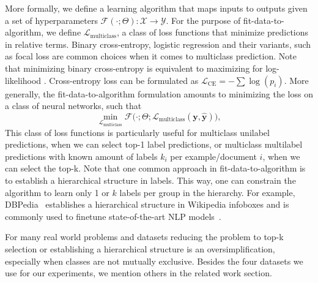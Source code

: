 More formally, we define a learning algorithm that maps inputs to outputs given a set of hyperparameters \(\mathcal{F}(\cdot ; \Theta): \mathcal{X} \rightarrow \mathcal{Y}\). For the purpose of fit-data-to-algorithm,
we define \(\mathcal{L}_{\text {multiclass}}\), a class of loss functions that
minimize predictions in relative terms. Binary cross-entropy, logistic regression and their
variants, such as focal loss are common choices when it comes to
multiclass prediction. Note that minimizing binary cross-entropy is equivalent to maximizing for log-likelihood
\cite[Section 4.3.4]{Bishop}.
Cross-entropy loss can be formulated as
\(\mathcal{L}_{\text {CE}}=-\sum \log \left(p_{i}\right)\).
More generally, the fit-data-to-algorithm formulation amounts to minimizing the loss on a class of neural networks, such that
%
\begin{equation}
\underset{\mathcal{L}_{\text {multiclass}}} {\min} \mathcal{F}\big(\cdot ;
\Theta; \mathcal{L}_{\text {multiclass}} (\mathbf{y}, \hat{\mathbf{y}})\big),
\end{equation}
%
This class of loss functions is particularly useful for multiclass unilabel predictions, when we can select top-1 label predictions, or multiclass multilabel predictions with known amount of labels $k_i$ per example/document $i$, when we can select the top-k. Note that one common approach in fit-data-to-algorithm is to establish a hierarchical structure in labels. This way, one can constrain the algorithm to learn only 1 or $k$ labels per group in the hierarchy. For example, DBPedia~\citep{lehmann2015dbpedia} establishes a hierarchical structure in Wikipedia infoboxes and is commonly used to finetune state-of-the-art NLP models~\citep[see, e.g.,][]{XLNet, ULMFit}.

For many real world problems and datasets reducing the problem to top-k selection or establishing a hierarchical structure is an oversimplification, especially when classes are not mutually exclusive. Besides the four datasets we use for our experiments, we mention others in the related work section.

